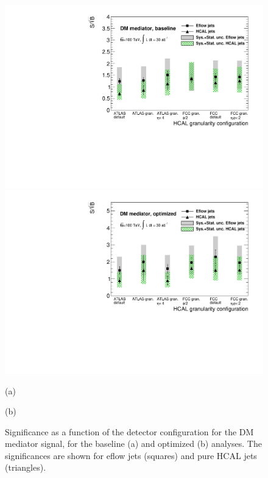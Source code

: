 \begin{figure}
	\centering
	\begin{minipage}{.5\textwidth}
		\centering
		\includegraphics[trim={.6cm 0 0 0},clip,width=\linewidth]{./Figures/SSBvsGran_DM.pdf}
	\end{minipage}%
	\begin{minipage}{.5\textwidth}
		\centering
		\includegraphics[trim={0 0 .6cm 0},clip,width=\linewidth]{./Figures/SSBvsGran_DM_Opt.pdf}
	\end{minipage}
	\begin{minipage}[t]{0.5\textwidth}
		\caption*{(a)}
	\end{minipage}%
	\hfill
	\begin{minipage}[t]{0.5\textwidth}
		\caption*{(b)}
	\end{minipage}
	\caption{Significance as a function of the detector configuration for the DM mediator signal, for the baseline (a) and optimized (b) analyses. The significances are shown for eflow jets (squares) and pure HCAL jets (triangles).}
	\label{fig:SSBvsGran2}
\end{figure}

